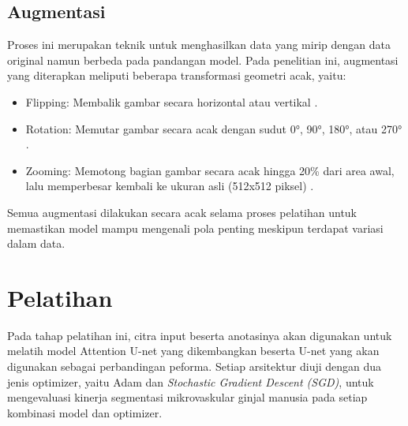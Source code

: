 \subsection{Augmentasi}

\noindent Proses ini merupakan teknik untuk menghasilkan data yang mirip dengan data original namun berbeda pada pandangan model. Pada penelitian ini, augmentasi yang diterapkan meliputi beberapa transformasi geometri acak, yaitu:
\begin{itemize}
	\item Flipping: Membalik gambar secara horizontal atau vertikal \cite{goceri_medical_2023,hu_multi-scale_2023,oktay_attention_2018}.
	\item Rotation: Memutar gambar secara acak dengan sudut 0°, 90°, 180°, atau 270° \cite{goceri_medical_2023,ronneberger_u-net_2015}.
	\item Zooming: Memotong bagian gambar secara acak hingga 20\% dari area awal, lalu memperbesar kembali ke ukuran asli (512x512 piksel) \cite{goceri_medical_2023,oktay_attention_2018}.
\end{itemize}

\noindent Semua augmentasi dilakukan secara acak selama proses pelatihan untuk memastikan model mampu mengenali pola penting meskipun terdapat variasi dalam data.





\section{Pelatihan}
\noindent Pada tahap pelatihan ini, citra input beserta anotasinya akan digunakan untuk melatih model Attention U-net yang dikembangkan beserta U-net yang akan digunakan sebagai perbandingan peforma. Setiap arsitektur diuji dengan dua jenis optimizer, yaitu Adam dan \textit{Stochastic Gradient Descent (SGD)}, untuk mengevaluasi kinerja segmentasi mikrovaskular ginjal manusia pada setiap kombinasi model dan optimizer.

